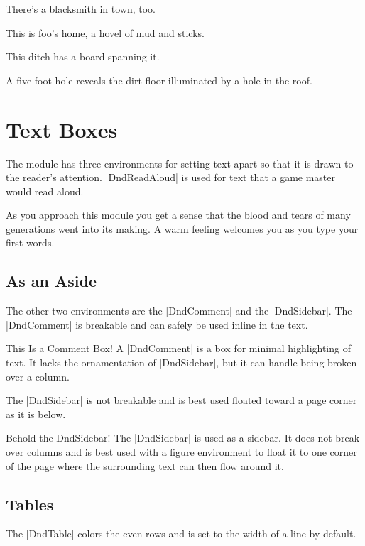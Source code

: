 \documentclass[letterpaper,twocolumn,openany,nodeprecatedcode]{dndbook}
\begin{document}
There's a blacksmith in town, too.

This is foo's home, a hovel of mud and sticks.

This ditch has a board spanning it.

A five-foot hole reveals the dirt floor illuminated by a hole in the roof.

\chapter{Text Boxes}

The module has three environments for setting text apart so that it is drawn to the reader's attention. |DndReadAloud| is used for text that a game master would read aloud.

\begin{DndReadAloud}
  As you approach this module you get a sense that the blood and tears of many generations went into its making. A warm feeling welcomes you as you type your first words.
\end{DndReadAloud}

\section{As an Aside}
The other two environments are the |DndComment| and the |DndSidebar|. The |DndComment| is breakable and can safely be used inline in the text.

\begin{DndComment}{This Is a Comment Box!}
  A |DndComment| is a box for minimal highlighting of text. It lacks the ornamentation of |DndSidebar|, but it can handle being broken over a column.
\end{DndComment}

The |DndSidebar| is not breakable and is best used floated toward a page corner as it is below.

\begin{DndSidebar}[float=!b]{Behold the DndSidebar!}
  The |DndSidebar| is used as a sidebar. It does not break over columns and is best used with a figure environment to float it to one corner of the page where the surrounding text can then flow around it.
\end{DndSidebar}

\section{Tables}
The |DndTable| colors the even rows and is set to the width of a line by default.
\end{document}
